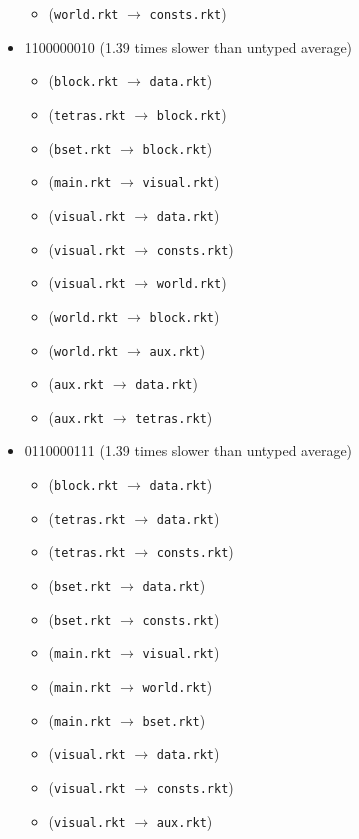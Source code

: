 \documentclass{article}
\newcommand{\mono}[1]{\texttt{#1}}
\begin{document}
\begin{itemize}
\begin{itemize}
  \item (\mono{world.rkt} $\rightarrow$ \mono{consts.rkt})
  \end{itemize}
\item 1100000010 (1.39 times slower than untyped average)
  \begin{itemize}
  \item (\mono{block.rkt} $\rightarrow$ \mono{data.rkt})
  \item (\mono{tetras.rkt} $\rightarrow$ \mono{block.rkt})
  \item (\mono{bset.rkt} $\rightarrow$ \mono{block.rkt})
  \item (\mono{main.rkt} $\rightarrow$ \mono{visual.rkt})
  \item (\mono{visual.rkt} $\rightarrow$ \mono{data.rkt})
  \item (\mono{visual.rkt} $\rightarrow$ \mono{consts.rkt})
  \item (\mono{visual.rkt} $\rightarrow$ \mono{world.rkt})
  \item (\mono{world.rkt} $\rightarrow$ \mono{block.rkt})
  \item (\mono{world.rkt} $\rightarrow$ \mono{aux.rkt})
  \item (\mono{aux.rkt} $\rightarrow$ \mono{data.rkt})
  \item (\mono{aux.rkt} $\rightarrow$ \mono{tetras.rkt})
  \end{itemize}
\item 0110000111 (1.39 times slower than untyped average)
  \begin{itemize}
  \item (\mono{block.rkt} $\rightarrow$ \mono{data.rkt})
  \item (\mono{tetras.rkt} $\rightarrow$ \mono{data.rkt})
  \item (\mono{tetras.rkt} $\rightarrow$ \mono{consts.rkt})
  \item (\mono{bset.rkt} $\rightarrow$ \mono{data.rkt})
  \item (\mono{bset.rkt} $\rightarrow$ \mono{consts.rkt})
  \item (\mono{main.rkt} $\rightarrow$ \mono{visual.rkt})
  \item (\mono{main.rkt} $\rightarrow$ \mono{world.rkt})
  \item (\mono{main.rkt} $\rightarrow$ \mono{bset.rkt})
  \item (\mono{visual.rkt} $\rightarrow$ \mono{data.rkt})
  \item (\mono{visual.rkt} $\rightarrow$ \mono{consts.rkt})
  \item (\mono{visual.rkt} $\rightarrow$ \mono{aux.rkt})

\end{itemize}
\end{itemize}
\end{document}
